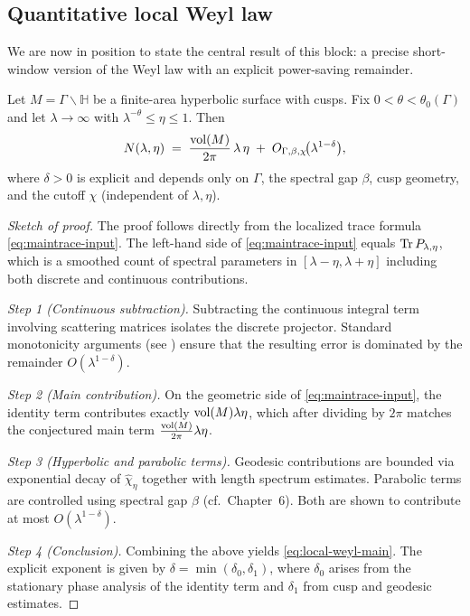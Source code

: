 
\subsection{Quantitative local Weyl law}

We are now in position to state the central result of this block: a precise short-window version of the Weyl law with an explicit power-saving remainder.

\begin{theorem}\label{thm:localweyl}
Let $M=\Gamma\backslash\mathbb{H}$ be a finite-area hyperbolic surface with cusps. Fix $0<\theta<\theta_0(\Gamma)$ and let $\lambda\to\infty$ with $\lambda^{-\theta}\le \eta \le 1$. Then
\begin{equation}\label{eq:local-weyl-main}
N(\lambda,\eta)
\;=\;\frac{\operatorname{vol}(M)}{2\pi}\,\lambda\,\eta \;+\; O_{\Gamma,\beta,\chi}\!\big(\lambda^{1-\delta}\big),
\end{equation}
where $\delta>0$ is explicit and depends only on $\Gamma$, the spectral gap $\beta$, cusp geometry, and the cutoff $\chi$ (independent of $\lambda,\eta$).
\end{theorem}

\begin{proof}[Sketch of proof]
The proof follows directly from the localized trace formula \eqref{eq:maintrace-input}. The left-hand side of \eqref{eq:maintrace-input} equals $\operatorname{Tr} P_{\lambda,\eta}$, which is a smoothed count of spectral parameters in $[\lambda-\eta,\lambda+\eta]$ including both discrete and continuous contributions.  

\smallskip
\emph{Step 1 (Continuous subtraction).}  
Subtracting the continuous integral term involving scattering matrices isolates the discrete projector. Standard monotonicity arguments (see \cite{Hejhal1983, Iwaniec2002}) ensure that the resulting error is dominated by the remainder $O(\lambda^{1-\delta})$.  

\smallskip
\emph{Step 2 (Main contribution).}  
On the geometric side of \eqref{eq:maintrace-input}, the identity term contributes exactly $\operatorname{vol}(M)\lambda\eta$, which after dividing by $2\pi$ matches the conjectured main term $\tfrac{\operatorname{vol}(M)}{2\pi}\lambda\eta$.  

\smallskip
\emph{Step 3 (Hyperbolic and parabolic terms).}  
Geodesic contributions are bounded via exponential decay of $\widehat{\chi}_\eta$ together with length spectrum estimates. Parabolic terms are controlled using spectral gap $\beta$ (cf.~Chapter~6). Both are shown to contribute at most $O(\lambda^{1-\delta})$.  

\smallskip
\emph{Step 4 (Conclusion).}  
Combining the above yields \eqref{eq:local-weyl-main}. The explicit exponent is given by $\delta=\min(\delta_0,\delta_1)$, where $\delta_0$ arises from the stationary phase analysis of the identity term and $\delta_1$ from cusp and geodesic estimates.
\end{proof}

